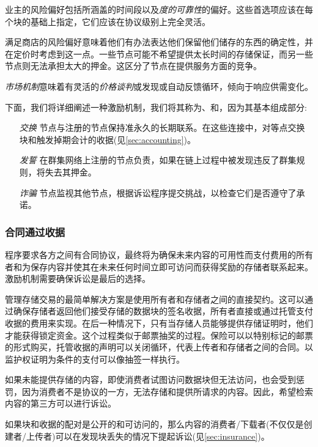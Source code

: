 业主的风险偏好包括所涵盖的时间段以及\emph{度的可靠性}的偏好。这些首选项应该在每个块的基础上指定，它们应该在协议级别上完全灵活。

满足商店的风险偏好意味着他们有办法表达他们保留他们储存的东西的确定性，并在定价时考虑到这一点。一些节点可能不希望提供太长时间的存储保证，而另一些节点则无法承担太大的押金。这区分了节点在提供服务方面的竞争。

\emph{市场机制}意味着有灵活的\emph{价格谈判}或发现或自动反馈循环，倾向于响应供需变化。

下面，我们将详细阐述一种激励机制，我们将其称为、和，因为其基本组成部分:

\begin{itemize}
\item[\emph{交换}]
  节点与注册的节点保持准永久的长期联系。在这些连接中，对等点交换块和触发掉期会计的收据(见\ref{sec:accounting})。
  
\item[\emph{发誓}]
  在群集网络上注册的节点负责，如果在链上过程中被发现违反了群集规则，将失去其押金。

\item[\emph{诈骗}]
  节点监视其他节点，根据诉讼程序提交挑战，以检查它们是否遵守了承诺。

\end{itemize}

\subsubsection{合同通过收据}

程序要求各方之间有合同协议，最终将为确保未来内容的可用性而支付费用的所有者和为保存内容并使其在未来任何时间立即可访问而获得奖励的存储者联系起来。激励机制需要确保诉讼是最后的选择。

管理存储交易的最简单解决方案是使用所有者和存储者之间的直接契约。这可以通过确保存储者返回他们接受存储的数据块的签名收据，所有者直接或通过托管支付收据的费用来实现。在后一种情况下，只有当存储人员能够提供存储证明时，他们才能获得锁定资金。这个过程类似于邮票抽奖的过程。保险可以以特别标记的邮票的形式购买，托管收据的声明可以关闭循环，代表上传者和存储者之间的合同。以监护权证明为条件的支付可以像抽签一样执行。

如果未能提供存储的内容，即使消费者试图访问数据块但无法访问，也会受到惩罚，因为消费者不是协议的一方，无法存储和提供所请求的内容。因此，希望检索内容的第三方可以进行诉讼。

如果块和收据的配对是公开的和可访问的，那么内容的消费者/下载者(不仅仅是创建者/上传者)可以在发现块丢失的情况下提起诉讼(见\ref{sec:insurance})。 

